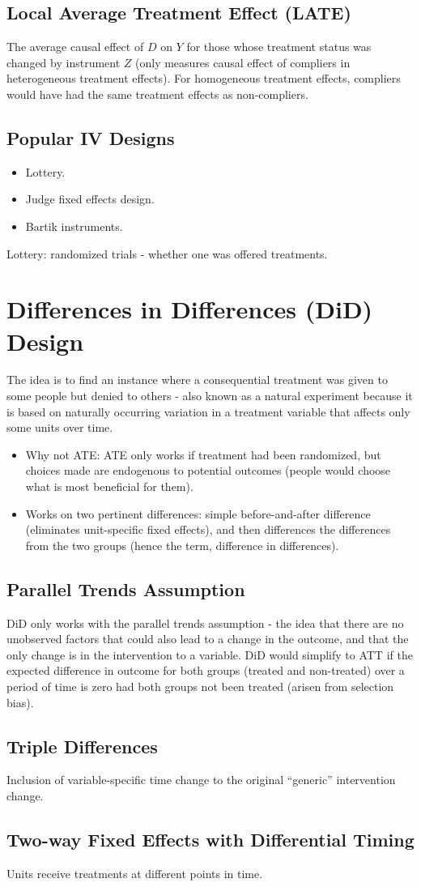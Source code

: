 \documentclass{article}
\begin{document}
\subsection*{Local Average Treatment Effect (LATE)}
The average causal effect of \(D\) on \(Y\) for those whose treatment status was changed by instrument \(Z\) (only measures causal effect of compliers in heterogeneous treatment effects). For homogeneous treatment effects, compliers would have had the same treatment effects as non-compliers.

\subsection*{Popular IV Designs}
\begin{itemize}
    \item Lottery.
    \item Judge fixed effects design.
    \item Bartik instruments.
\end{itemize}
Lottery: randomized trials - whether one was offered treatments.

\section*{Differences in Differences (DiD) Design}
The idea is to find an instance where a consequential treatment was given to some people but denied to others - also known as a natural experiment because it is based on naturally occurring variation in a treatment variable that affects only some units over time.

\begin{itemize}
    \item Why not ATE: ATE only works if treatment had been randomized, but choices made are endogenous to potential outcomes (people would choose what is most beneficial for them).
    \item Works on two pertinent differences: simple before-and-after difference (eliminates unit-specific fixed effects), and then differences the differences from the two groups (hence the term, difference in differences).
\end{itemize}

\subsection*{Parallel Trends Assumption}
DiD only works with the parallel trends assumption - the idea that there are no unobserved factors that could also lead to a change in the outcome, and that the only change is in the intervention to a variable. DiD would simplify to ATT if the expected difference in outcome for both groups (treated and non-treated) over a period of time is zero had both groups not been treated (arisen from selection bias).

\subsection*{Triple Differences}
Inclusion of variable-specific time change to the original ``generic'' intervention change.

\subsection*{Two-way Fixed Effects with Differential Timing}
Units receive treatments at different points in time.
\end{document}
